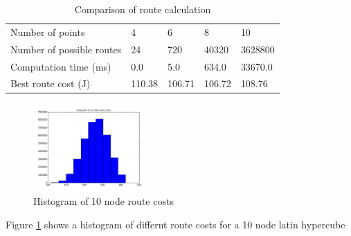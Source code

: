 \documentclass[a4paper,12pt,twoside]{article}
\begin{document}
\begin{table}[width=\textwidth]
\centering
    \begin{tabular}{lllll}
    Number of points	& 4	& 6	& 8	& 10	\\
Number of possible routes	& 24	& 720	& 40320	& 3628800	\\
Computation time (ms)	& 0.0	& 5.0	& 634.0	& 33670.0	\\
Best route cost (J)	& 110.38	& 106.71	& 106.72	& 108.76	\\

    \end{tabular}
\caption{Comparison of route calculation}
\label{tbl:comparison_of_route_calculation}
\end{table}

\begin{figure}[H]
\centering
\includegraphics[width=0.4\textwidth]{figures/histogram_of_10_node_route_costs.png} 
\caption{Histogram of 10 node route costs}
\label{fig:histogram_of_10_node_route_costs}
\end{figure}

Figure \ref{fig:histogram_of_10_node_route_costs} shows a histogram of differnt route costs for a 10 node latin hypercube
\end{document}
